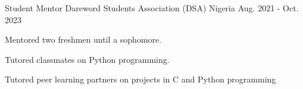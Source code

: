 

\begin{cventries}

  \cventry
    {Student Mentor} %
    {Dareword Students Association (DSA) } %
    {Nigeria} %
    {Aug. 2021 - Oct. 2023} %
    {
      \begin{cvitems} %
        \item {Mentored two freshmen until a sophomore.}
        \item {Tutored classmates on Python programming.}
        \item {Tutored peer learning partners on projects in C and Python programming}
        
      \end{cvitems}
    }
\end{cventries}
